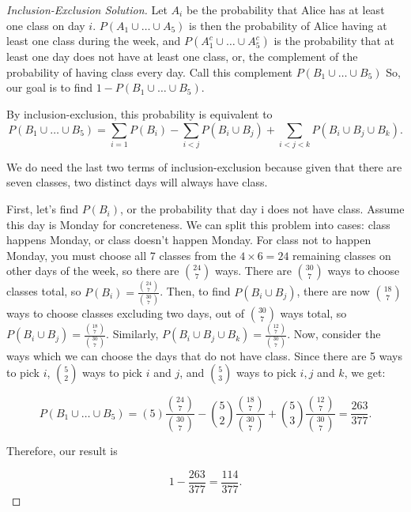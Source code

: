 \documentclass[10pt]{article}
\begin{document}
\begin{proof}[Inclusion-Exclusion Solution]

Let $A_i$ be the probability that Alice has at least one class on day $i$. $P(A_1 \cup \ldots \cup A_5)$ is then the probability of Alice having at least one class during the week, and $P(A_1^c \cup \ldots \cup A_5^c)$ is the probability that at least one day does not have at least one class, or, the complement of the probability of having class every day. Call this complement $P(B_1 \cup \ldots \cup B_5)$ So, our goal is to find $1 - P(B_1 \cup \ldots \cup B_5)$. 

By inclusion-exclusion, this probability is equivalent to 
\[
P(B_1 \cup \ldots \cup B_5) = \sum_{i=1} P(B_i) - \sum_{i < j} P(B_i \cup B_j) + \sum_{i < j < k} P(B_i \cup B_j \cup B_k).
\]

We do need the last two terms of inclusion-exclusion because given that there are seven classes, two distinct days will always have class.

First, let's find $P(B_i)$, or the probability that day i does not have class. Assume this day is Monday for concreteness. We can split this problem into cases: class happens Monday, or class doesn't happen Monday. For class not to happen Monday, you must choose all 7 classes from the $4 \times 6 = 24$ remaining classes on other days of the week, so there are \(\binom{24}{7}\) ways. There are \(\binom{30}{7}\) ways to choose classes total, so \(P(B_i) = \frac{\binom{24}{7}}{\binom{30}{7}}\). Then, to find $P(B_i \cup B_j)$, there are now \(\binom{18}{7}\) ways to choose classes excluding two days, out of \(\binom{30}{7}\) ways total, so \(P(B_i \cup B_j) = \frac{\binom{18}{7}}{\binom{30}{7}}\). Similarly, \(P(B_i \cup B_j \cup B_k) = \frac{\binom{12}{7}}{\binom{30}{7}}\). Now, consider the ways which we can choose the days that do not have class. Since there are 5 ways to pick $i$, \(\binom{5}{2}\) ways to pick $i$ and $j$, and \(\binom{5}{3}\) ways to pick $i, j$ and $k$, we get:

\[
P(B_1 \cup \ldots \cup B_5) = (5)\frac{\binom{24}{7}}{\binom{30}{7}} - \binom{5}{2}\frac{\binom{18}{7}}{\binom{30}{7}} + \binom{5}{3}\frac{\binom{12}{7}}{\binom{30}{7}} = \frac{263}{377}.
\]

Therefore, our result is

\[
1 - \frac{263}{377} = \frac{114}{377}.
\]

\end{proof}
\end{document}
